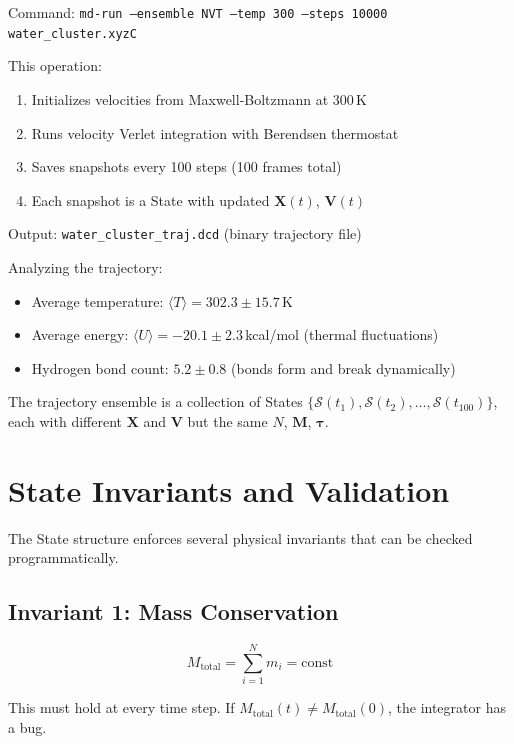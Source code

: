 \documentclass[11pt]{article}
\begin{document}
Command: \texttt{md-run --ensemble NVT --temp 300 --steps 10000 water\_cluster.xyzC}

This operation:
\begin{enumerate}
\item Initializes velocities from Maxwell-Boltzmann at 300\,K
\item Runs velocity Verlet integration with Berendsen thermostat
\item Saves snapshots every 100 steps (100 frames total)
\item Each snapshot is a State with updated $\mathbf{X}(t)$, $\mathbf{V}(t)$
\end{enumerate}

Output: \texttt{water\_cluster\_traj.dcd} (binary trajectory file)

Analyzing the trajectory:
\begin{itemize}
\item Average temperature: $\langle T \rangle = 302.3 \pm 15.7$\,K
\item Average energy: $\langle U \rangle = -20.1 \pm 2.3$\,kcal/mol (thermal fluctuations)
\item Hydrogen bond count: $5.2 \pm 0.8$ (bonds form and break dynamically)
\end{itemize}

The trajectory ensemble is a collection of States $\{\mathcal{S}(t_1), \mathcal{S}(t_2), \ldots, \mathcal{S}(t_{100})\}$, each with different $\mathbf{X}$ and $\mathbf{V}$ but the same $N$, $\mathbf{M}$, $\boldsymbol{\tau}$.

\section{State Invariants and Validation}

The State structure enforces several physical invariants that can be checked programmatically.

\subsection{Invariant 1: Mass Conservation}

\begin{equation}
M_{\text{total}} = \sum_{i=1}^{N} m_i = \text{const}
\end{equation}

This must hold at every time step. If $M_{\text{total}}(t) \neq M_{\text{total}}(0)$, the integrator has a bug.
\end{document}
